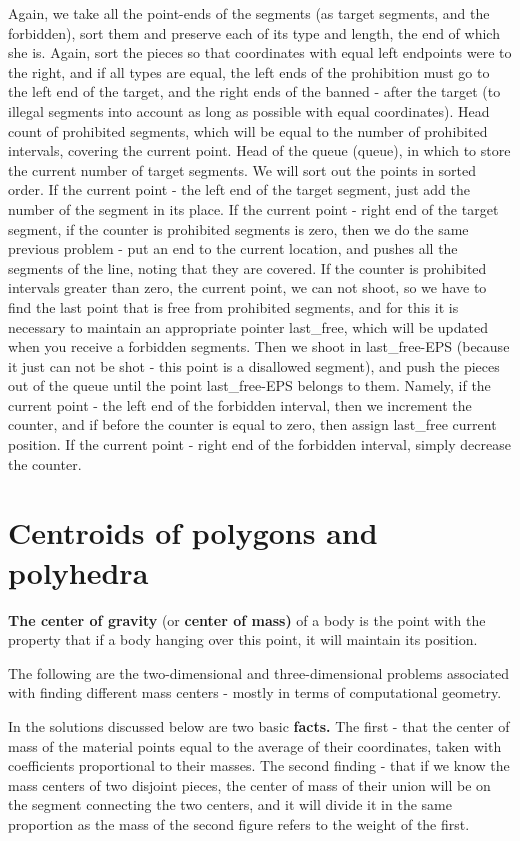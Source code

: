 Again, we take all the point-ends of the segments (as target segments, and the forbidden), sort them and preserve each of its type and length, the end of which she is. Again, sort the pieces so that coordinates with equal left endpoints were to the right, and if all types are equal, the left ends of the prohibition must go to the left end of the target, and the right ends of the banned - after the target (to illegal segments into account as long as possible with equal coordinates). Head count of prohibited segments, which will be equal to the number of prohibited intervals, covering the current point. Head of the queue (queue), in which to store the current number of target segments. We will sort out the points in sorted order. If the current point - the left end of the target segment, just add the number of the segment in its place. If the current point - right end of the target segment, if the counter is prohibited segments is zero, then we do the same previous problem - put an end to the current location, and pushes all the segments of the line, noting that they are covered. If the counter is prohibited intervals greater than zero, the current point, we can not shoot, so we have to find the last point that is free from prohibited segments, and for this it is necessary to maintain an appropriate pointer last\_free, which will be updated when you receive a forbidden segments. Then we shoot in last\_free-EPS (because it just can not be shot - this point is a disallowed segment), and push the pieces out of the queue until the point last\_free-EPS belongs to them. Namely, if the current point - the left end of the forbidden interval, then we increment the counter, and if before the counter is equal to zero, then assign last\_free current position. If the current point - right end of the forbidden interval, simply decrease the counter.

\section{ Centroids of polygons and polyhedra }
\textbf{The center of gravity} (or \textbf{center of mass)} of a body is the point with the property that if a body hanging over this point, it will maintain its position.

The following are the two-dimensional and three-dimensional problems associated with finding different mass centers - mostly in terms of computational geometry.

In the solutions discussed below are two basic \textbf{facts.} The first - that the center of mass of the material points equal to the average of their coordinates, taken with coefficients proportional to their masses. The second finding - that if we know the mass centers of two disjoint pieces, the center of mass of their union will be on the segment connecting the two centers, and it will divide it in the same proportion as the mass of the second figure refers to the weight of the first.


